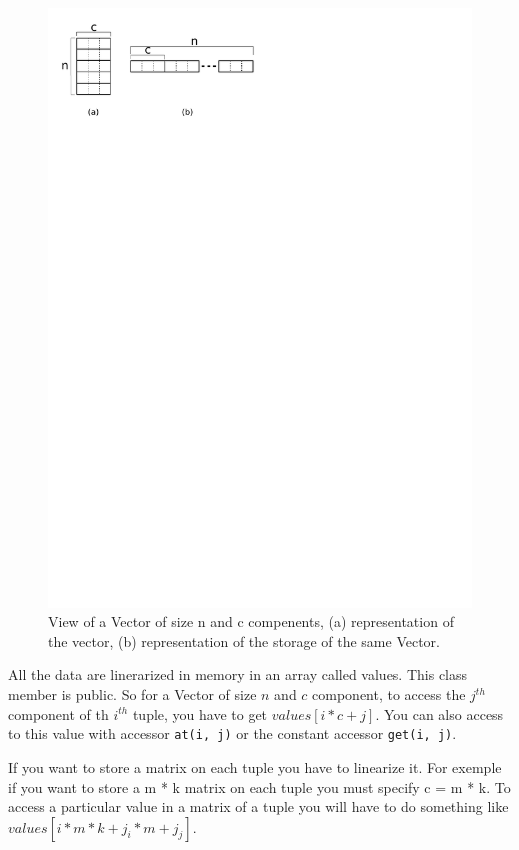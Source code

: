 \documentclass[a4paper,11pt]{book}
\newcommand{\code}[1]{{\tt{#1}}}
\begin{document}
\begin{figure}[!htb]
  \centering
  \includegraphics{figures/vectors}
  \caption{View of  a Vector of size  n and c compenents,  (a) representation of
    the vector, (b) representation of the storage of the same Vector.}
  \label{fig:vectors}
\end{figure}

All the  data are linerarized  in memory in  an array called values.  This class
member is public.  So for a Vector  of size $n$ and $c$ component, to access the
$j^{th}$  component of  th  $i^{th}$ tuple,  you have  to  get $values[i  * c  +
j]$. You  can also  access to this  value with  accessor \code{at(i, j)}  or the
constant accessor \code{get(i, j)}.

If  you want to  store a  matrix on  each tuple  you have  to linearize  it. For
exemple if you want to store a m * k matrix on each tuple you must specify c = m
* k.  To access a particular value  in a matrix of  a tuple you will  have to do
something like $values[ i * m * k + j_i * m + j_j]$.
\end{document}
